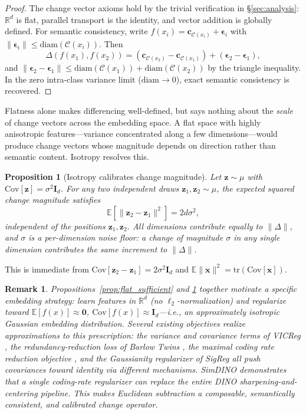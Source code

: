 \documentclass{article}
\newtheorem{proposition}{Proposition}
\newtheorem*{remark}{Remark}
\newcommand{\vect}[1]{\mathbf{#1}}
\newcommand{\mat}[1]{\mathbf{#1}}
\newcommand{\R}{\mathbb{R}}
\newcommand*{\secref}[1]{\hyperref[{#1}]{\S\ref*{#1}}}
\begin{document}
\begin{proof}
The change vector axioms hold by the trivial verification in \secref{sec:analysis}: $\R^d$ is flat, parallel transport is the identity, and vector addition is globally defined. For semantic consistency, write $f(x_i) = \vect{c}_{\mathcal{C}(x_i)} + \vect{\epsilon}_i$ with $\|\vect{\epsilon}_i\| \le \mathrm{diam}(\mathcal{C}(x_i))$. Then
\[
    \Delta(f(x_1), f(x_2)) = (\vect{c}_{\mathcal{C}(x_2)} - \vect{c}_{\mathcal{C}(x_1)}) + (\vect{\epsilon}_2 - \vect{\epsilon}_1),
\]
and $\|\vect{\epsilon}_2 - \vect{\epsilon}_1\| \le \mathrm{diam}(\mathcal{C}(x_1)) + \mathrm{diam}(\mathcal{C}(x_2))$ by the triangle inequality. In the zero intra-class variance limit ($\mathrm{diam} \to 0$), exact semantic consistency is recovered.
\end{proof}

Flatness alone makes differencing well-defined, but says nothing about the \emph{scale} of change vectors across the embedding space. A flat space with highly anisotropic features---variance concentrated along a few dimensions---would produce change vectors whose magnitude depends on direction rather than semantic content. Isotropy resolves this.

\begin{proposition}[Isotropy calibrates change magnitude]
\label{prop:isotropy_calibration}
Let $\vect{z} \sim \mu$ with $\mathrm{Cov}[\vect{z}] = \sigma^2 \mat{I}_d$. For any two independent draws $\vect{z}_1, \vect{z}_2 \sim \mu$, the expected squared change magnitude satisfies
\[
    \mathbb{E}\!\left[\|\vect{z}_2 - \vect{z}_1\|^2\right] = 2d\sigma^2,
\]
independent of the positions $\vect{z}_1, \vect{z}_2$. All dimensions contribute equally to $\|\Delta\|$, and $\sigma$ is a per-dimension noise floor: a change of magnitude $\sigma$ in any single dimension contributes the same increment to $\|\Delta\|$.
\end{proposition}

\noindent This is immediate from $\mathrm{Cov}[\vect{z}_2 - \vect{z}_1] = 2\sigma^2 \mat{I}_d$ and $\mathbb{E}\|\vect{x}\|^2 = \mathrm{tr}(\mathrm{Cov}[\vect{x}])$.

\begin{remark}
Propositions~\ref{prop:flat_sufficient} and \ref{prop:isotropy_calibration} together motivate a specific embedding strategy: learn features in $\R^d$ (no $\ell_2$-normalization) and regularize toward $\mathbb{E}[f(x)] \approx \vect{0}$, $\mathrm{Cov}[f(x)] \approx \mat{I}_d$---i.e., an approximately isotropic Gaussian embedding distribution. Several existing objectives realize approximations to this prescription: the variance and covariance terms of VICReg \citep{bardes2022vicreg}, the redundancy-reduction loss of Barlow Twins \citep{zbontar2021barlow}, the maximal coding rate reduction objective \citep{yu2020mcr2, ma2007segmentation}, and the Gaussianity regularizer of SigReg \citep{schaeffer2024sigreg} all push covariances toward identity via different mechanisms. SimDINO \citep{wu2025simdino} demonstrates that a single coding-rate regularizer can replace the entire DINO sharpening-and-centering pipeline. This makes Euclidean subtraction a composable, semantically consistent, and calibrated change operator.
\end{remark}
\end{document}
